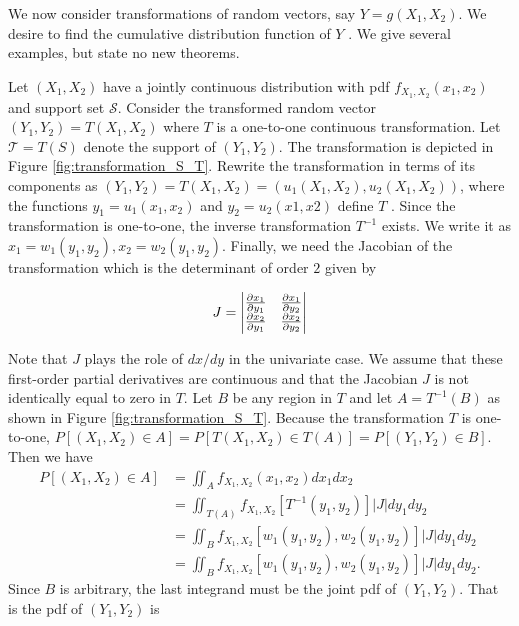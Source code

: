 We now consider transformations of random vectors, say $Y = g(X_1, X_2)$. We
desire to find the cumulative distribution function of $Y$ . We give several examples,
but state no new theorems.
\par
Let $(X_1, X_2)$ have a jointly continuous distribution with pdf $f_{X_1,X_2} (x_1, x_2)$ and
support set $\mathcal{S}$. Consider the transformed random vector $(Y_1, Y_2) = T (X_1, X_2)$ 
where $T$ is a one-to-one continuous transformation. Let $\mathcal{T} = T (S)$ denote the support of
$(Y_1, Y_2)$. The transformation is depicted in Figure \ref{fig:transformation_S_T}. Rewrite the transformation in terms of its components as $(Y_1, Y_2) = T (X_1, X_2)=(u_1(X_1, X_2), u_2(X_1, X_2))$,
where the functions $y_1 = u_1(x_1, x_2)$ and $y_2 = u_2(x1, x2)$ define $T$ . 
Since the transformation is one-to-one, the inverse transformation $T^{-1}$ exists. We write it as
$x_1 = w_1(y_1, y_2), x_2 = w_2(y_1, y_2)$. 
Finally, we need the Jacobian of the transformation which is the determinant of order $2$ given by

\begin{align*}
    J=\begin{vmatrix}
        \frac{\partial x_1}{\partial y_1} & \frac{\partial x_1}{\partial y_2}\\ 
        \frac{\partial x_2}{\partial y_1} & \frac{\partial x_2}{\partial y_2} \notag
    \end{vmatrix}
\end{align*}

Note that $J$ plays the role of $dx/dy$ in the univariate case. We assume that these
first-order partial derivatives are continuous and that the Jacobian $J$ is not identically 
equal to zero in $T$.
Let $B$ be any region in $T$ and let $A = T^{-1}(B)$ as shown in Figure \ref{fig:transformation_S_T}.
Because the transformation $T$ is one-to-one, $P[(X_1, X_2) \in A] = P[T (X_1, X_2) \in T(A)] = P[(Y_1, Y_2) \in B]$. 
Then we have
\begin{align*}
    P[(X_1,X_2)\in A] &= \iint_{A} f_{X_1,X_2}(x_1,x_2) dx_1dx_2\\
                      &= \iint_{T(A)} f_{X_1,X_2}[T^{-1}(y_1,y_2)]|J|dy_1dy_2\\
                      &= \iint_{B} f_{X_1,X_2}[w_1(y_1,y_2),w_2(y_1,y_2)]|J| dy_1dy_2\\
                      &= \iint_{B} f_{X_1,X_2}[w_1(y_1,y_2),w_2(y_1,y_2)]|J| dy_1dy_2.
\end{align*}
Since $B$ is arbitrary, the last integrand must be the joint pdf 
of $(Y_1, Y_2)$. That is the pdf of $(Y_1, Y_2)$ is

